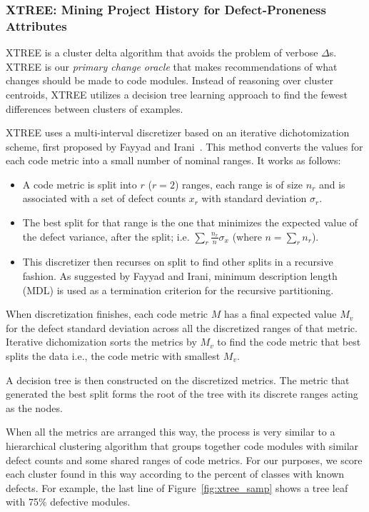 \documentclass[twocolumn,5p]{elsarticle}
\newcommand{\fig}[1]{Figure~\ref{fig:#1}}
\theoremstyle{break}
\begin{document}
	\subsubsection{XTREE: Mining Project History for Defect-Proneness 
	Attributes}
	\label{sect:xtreextree}
	XTREE  is a cluster delta algorithm
	that avoids the problem of verbose $\Delta$s.
	XTREE is our {\em primary change oracle} that makes recommendations
	of what changes should be made to code modules.
	Instead of reasoning over cluster centroids,
	XTREE utilizes a decision tree learning approach
	to find the fewest differences between clusters of examples.
	
	
	XTREE uses a multi-interval discretizer based on an iterative 
	dichotomization scheme, first proposed by Fayyad and Irani~\cite{fi}. This 
	method converts the values for each code metric into a small number of 
	nominal ranges. It works as follows:
	\begin{itemize}
		\item A code metric is split into $r$ ($r=2$) ranges, each range is of
		size $n_r$ and is associated with a set of defect counts $x_r$ with 
		standard deviation
		$\sigma_r$.
		\item The best split for that range is the one that minimizes the 
		expected value of the
		defect variance, after the split; i.e. $\sum_r\frac{n_r}{n}\sigma_x$ 
		(where $n=\sum_r n_r$).
		\item This discretizer then recurses on  split to find 
		other splits in a recursive fashion. As suggested by Fayyad and Irani, 
		minimum description length (MDL) is used as a termination criterion for 
		the recursive partitioning.
	\end{itemize}
	
	When discretization finishes, each code metric $M$ has a
	final expected value $M_v$ for the defect standard deviation
	across all the discretized ranges of that metric.
	Iterative dichomization sorts the metrics by $M_v$
	to find the code metric that best splits the data i.e., the code metric 
	with smallest $M_v$.
	
	A decision tree is then constructed on the discretized metrics. The metric 
	that generated the best split forms the root of the tree with its discrete 
	ranges acting as the nodes.
	
	When all the metrics are arranged this way, the process is very similar to 
	a hierarchical clustering algorithm that groups together code modules with 
	similar defect counts and some shared ranges of code metrics.
	For our purposes, we score each cluster found in this way according
	to the percent of classes with known defects. For example, the last line 
	of 
	\fig{xtree_samp} shows a tree leaf with 75\%
	defective modules.
	
\end{document}
